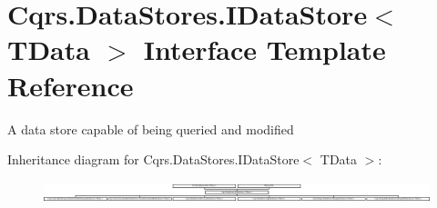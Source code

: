 \hypertarget{interfaceCqrs_1_1DataStores_1_1IDataStore}{}\section{Cqrs.\+Data\+Stores.\+I\+Data\+Store$<$ T\+Data $>$ Interface Template Reference}
\label{interfaceCqrs_1_1DataStores_1_1IDataStore}


A data store capable of being queried and modified  


Inheritance diagram for Cqrs.\+Data\+Stores.\+I\+Data\+Store$<$ T\+Data $>$\+:\begin{figure}[H]
\begin{center}
\leavevmode
\includegraphics[height=0.623608cm]{interfaceCqrs_1_1DataStores_1_1IDataStore}
\end{center}
\end{figure}
